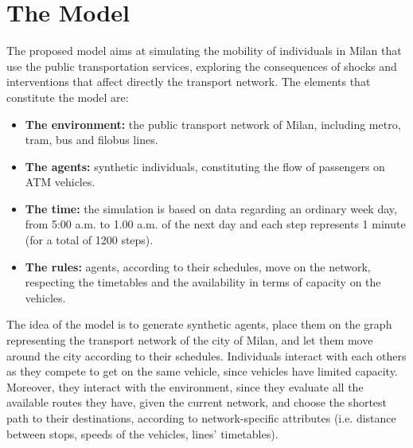 \section{The Model}
The proposed model aims at simulating the mobility of individuals in Milan that use the public transportation services, exploring the consequences of shocks and interventions that affect directly the transport network. The elements that constitute the model are:
\begin{itemize}
    \item \textbf{The environment:} the public transport network of Milan, including metro, tram, bus and filobus lines.
    \item \textbf{The agents:} synthetic individuals, constituting the flow of passengers on ATM vehicles.
    \item \textbf{The time:} the simulation is based on data regarding an ordinary week day, from 5:00 a.m. to 1.00 a.m. of the next day and each step represents 1 minute (for a total of 1200 steps).
    \item \textbf{The rules:} agents, according to their schedules, move on the network, respecting the timetables and the availability in terms of capacity on the vehicles.
\end{itemize}
The idea of the model is to generate synthetic agents, place them on the graph representing the transport network of the city of Milan, and let them move around the city according to their schedules. Individuals interact with each others as they compete to get on the same vehicle, since vehicles have limited capacity. Moreover, they interact with the environment, since they evaluate all the available routes they have, given the current network, and choose the shortest path to their destinations, according to network-specific attributes (i.e. distance between stops, speeds of the vehicles, lines' timetables). 


